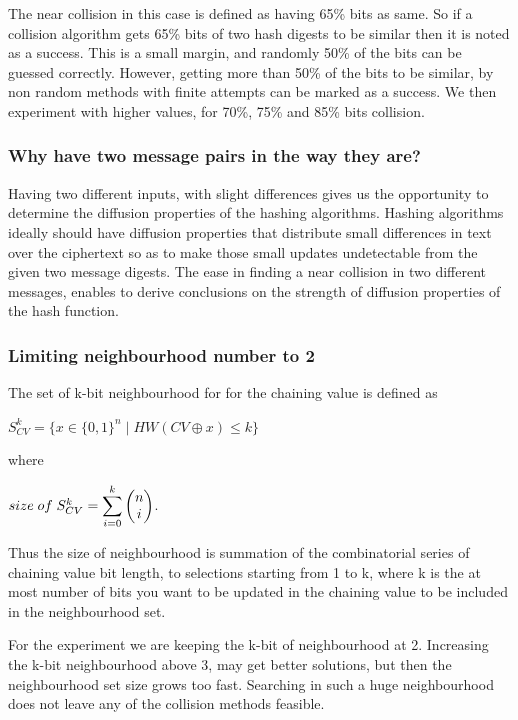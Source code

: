 The near collision in this case is defined as having 65\% bits as same. So if a collision algorithm gets 65\% bits
of two hash digests to be similar then it is noted as a success. This is a small margin, and randomly 50\% of the
bits can be guessed correctly. However, getting more than 50\% of the bits to be similar, by non random methods with
finite attempts can be marked as a success. We then experiment with higher values, for 70\%, 75\% and 85\% bits
collision.

\subsubsection{Why have two message pairs in the way they are?}
Having two different inputs, with slight differences gives us the opportunity to determine the diffusion properties
of the hashing algorithms. Hashing algorithms ideally should have diffusion properties that distribute small 
differences in text over the ciphertext so as to make those small updates undetectable from the given two message
digests. The ease in finding a near collision in two different messages, enables to derive conclusions on the
strength of diffusion properties of the hash function.

\subsubsection{Limiting neighbourhood number to 2}
The set of k-bit neighbourhood for for the chaining value is defined as 
\begin{center}$S^{k}_{CV} = \{ x \in \{0, 1\}^{n} \mid HW( CV \oplus x ) \leq k \}$\end{center}
where
\begin{center}$ size \thickspace of \thickspace S^{k}_{CV} = 
\displaystyle \sum \limits_{i = 0}^{k} \begin{pmatrix} n \\ i \end{pmatrix}$.\end{center}

Thus the size of neighbourhood is summation of the combinatorial series of chaining value bit length, to selections
starting from 1 to k, where k is the at most number of bits you want to be updated in the chaining value to be
included in the neighbourhood set.

For the experiment we are keeping the k-bit of neighbourhood at 2. Increasing the k-bit neighbourhood above 3, 
may get better solutions, but then the neighbourhood set size grows too fast. Searching in such a huge neighbourhood
does not leave any of the collision methods feasible.

